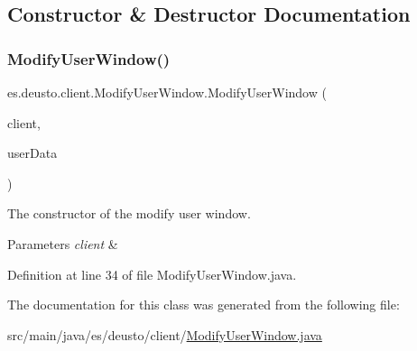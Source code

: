 \subsection{Constructor \& Destructor Documentation}
\mbox{\label{classes_1_1deusto_1_1client_1_1_modify_user_window_aa3748a01efbae39f32f99255a13e5d39}} 
\subsubsection{\texorpdfstring{Modify\+User\+Window()}{ModifyUserWindow()}}
{\footnotesize\ttfamily es.\+deusto.\+client.\+Modify\+User\+Window.\+Modify\+User\+Window (\begin{DoxyParamCaption}\item[{\hyperlink{classes_1_1deusto_1_1client_1_1_example_client}{Example\+Client}}]{client,  }\item[{\hyperlink{classes_1_1deusto_1_1serialization_1_1_user_data}{User\+Data}}]{user\+Data }\end{DoxyParamCaption})}

The constructor of the modify user window. ~\newline

\begin{DoxyParams}{Parameters}
{\em client} & \\
\hline
\end{DoxyParams}


Definition at line 34 of file Modify\+User\+Window.\+java.



The documentation for this class was generated from the following file\+:\begin{DoxyCompactItemize}
\item 
src/main/java/es/deusto/client/\hyperlink{_modify_user_window_8java}{Modify\+User\+Window.\+java}\end{DoxyCompactItemize}
